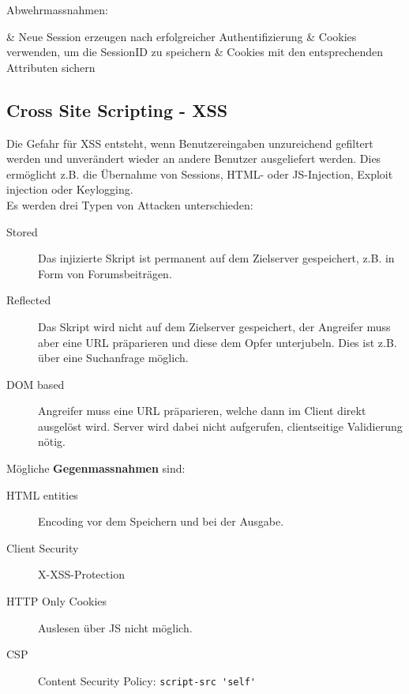 Abwehrmassnahmen:
\begin{easylist}[itemize]
	& Neue Session erzeugen nach erfolgreicher Authentifizierung
	& Cookies verwenden, um die SessionID zu speichern
	& Cookies mit den entsprechenden Attributen sichern
\end{easylist}

\subsection{Cross Site Scripting - XSS}
Die Gefahr für XSS entsteht, wenn Benutzereingaben unzureichend gefiltert werden und unverändert wieder an andere Benutzer ausgeliefert werden. Dies ermöglicht z.B. die Übernahme von Sessions, HTML- oder JS-Injection, Exploit injection oder Keylogging.\\
Es werden drei Typen von Attacken unterschieden:
\begin{description}
	\item[Stored] Das injizierte Skript ist permanent auf dem Zielserver gespeichert, z.B. in Form von Forumsbeiträgen.
	\item[Reflected] Das Skript wird nicht auf dem Zielserver gespeichert, der Angreifer muss aber eine URL präparieren und diese dem Opfer unterjubeln. Dies ist z.B. über eine Suchanfrage möglich.
	\item[DOM based] Angreifer muss eine URL präparieren, welche dann im Client direkt ausgelöst wird. Server wird dabei nicht aufgerufen, clientseitige Validierung nötig.
\end{description}

Mögliche \textbf{Gegenmassnahmen} sind:
\begin{description}
	\item[HTML entities] Encoding vor dem Speichern und bei der Ausgabe.
	\item[Client Security] X-XSS-Protection
	\item[HTTP Only Cookies] Auslesen über JS nicht möglich.
	\item[CSP] Content Security Policy: \lstinline|script-src 'self'|
\end{description}

